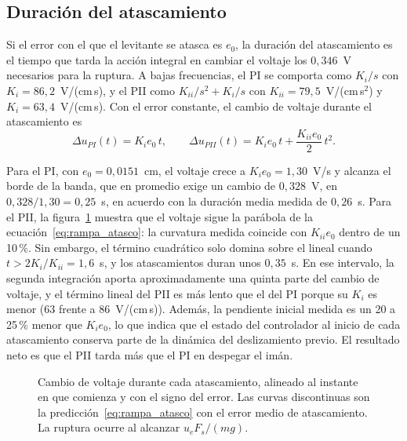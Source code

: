 \subsection{Duración del atascamiento}

Si el error con el que el levitante se atasca es $e_0$, la duración del atascamiento es el tiempo que tarda la acción integral en cambiar el voltaje los $0{,}346$~V necesarios para la ruptura. A bajas frecuencias, el PI se comporta como $K_i/s$ con $K_i=86{,}2$~V/(cm\,s), y el PII como $K_{ii}/s^2 + K_i/s$ con $K_{ii}=79{,}5$~V/(cm\,s$^2$) y $K_i=63{,}4$~V/(cm\,s). Con el error constante, el cambio de voltaje durante el atascamiento es
\begin{equation}
\Delta u_{PI}(t) = K_i e_0\, t, \qquad
\Delta u_{PII}(t) = K_i e_0\, t + \frac{K_{ii} e_0}{2}\, t^2 .
\label{eq:rampa_atasco}
\end{equation}

Para el PI, con $e_0=0{,}0151$~cm, el voltaje crece a $K_i e_0 = 1{,}30$~V/s y alcanza el borde de la banda, que en promedio exige un cambio de $0{,}328$~V, en $0{,}328/1{,}30=0{,}25$~s, en acuerdo con la duración media medida de $0{,}26$~s. Para el PII, la figura~\ref{fig:atasco} muestra que el voltaje sigue la parábola de la ecuación~\eqref{eq:rampa_atasco}: la curvatura medida coincide con $K_{ii}e_0$ dentro de un 10\,\%. Sin embargo, el término cuadrático solo domina sobre el lineal cuando $t > 2K_i/K_{ii} = 1{,}6$~s, y los atascamientos duran unos $0{,}35$~s. En ese intervalo, la segunda integración aporta aproximadamente una quinta parte del cambio de voltaje, y el término lineal del PII es más lento que el del PI porque su $K_i$ es menor (63 frente a 86~V/(cm\,s)). Además, la pendiente inicial medida es un 20 a 25\,\% menor que $K_i e_0$, lo que indica que el estado del controlador al inicio de cada atascamiento conserva parte de la dinámica del deslizamiento previo. El resultado neto es que el PII tarda más que el PI en despegar el imán.

\begin{figure}[ht]
    \centering
    
    \caption[Voltaje durante el atascamiento]{Cambio de voltaje durante cada atascamiento, alineado al instante en que comienza y con el signo del error. Las curvas discontinuas son la predicción~\eqref{eq:rampa_atasco} con el error medio de atascamiento. La ruptura ocurre al alcanzar $u_eF_s/(mg)$.}
    \label{fig:atasco}
\end{figure}

